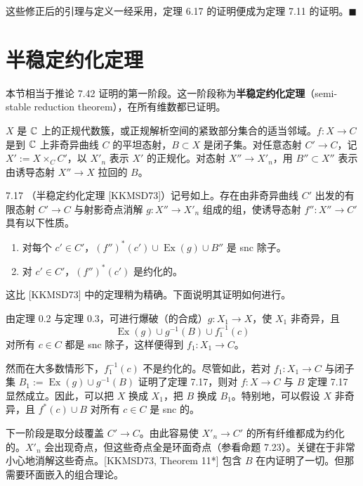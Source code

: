 这些修正后的引理与定义一经采用，定理 6.17 的证明便成为定理 7.11 的证明。\hfill$\blacksquare$

\section{半稳定约化定理}

本节相当于推论 7.42 证明的第一阶段。这一阶段称为\textbf{半稳定约化定理}（semi-stable reduction theorem），在所有维数都已证明。

$X$ 是 $\mathbb{C}$ 上的正规代数簇，或正规解析空间的紧致部分集合的适当邻域。$f\colon X\to C$ 是到 $\mathbb{C}$ 上非奇异曲线 $C$ 的平坦态射，$B\subset X$ 是闭子集。对任意态射 $C'\to C$，记 $X':=X\times_CC'$，以 $X'_n$ 表示 $X'$ 的正规化。对态射 $X''\to X'_n$，用 $B''\subset X''$ 表示由诱导态射 $X''\to X$ 拉回的 $B$。

\begin{theorem*}{7.17}
（半稳定约化定理 [KKMSD73]）记号如上。存在由非奇异曲线 $C'$ 出发的有限态射 $C'\to C$ 与射影奇点消解 $g\colon X''\to X'_n$ 组成的组，使诱导态射 $f''\colon X''\to C'$ 具有以下性质。
\begin{enumerate}[label=(\arabic*),leftmargin=2.4em,itemsep=1pt,topsep=2pt,parsep=0pt]
\item 对每个 $c'\in C'$，$(f'')^*(c')\cup\operatorname{Ex}(g)\cup B''$ 是 snc 除子。
\item 对 $c'\in C'$，$(f'')^*(c')$ 是约化的。
\end{enumerate}
\end{theorem*}

这比 [KKMSD73] 中的定理稍为精确。下面说明其证明如何进行。

由定理 0.2 与定理 0.3，可进行爆破（的合成）$g\colon X_1\to X$，使 $X_1$ 非奇异，且
\[
\operatorname{Ex}(g)\cup g^{-1}(B)\cup f_1^{-1}(c)
\]
对所有 $c\in C$ 都是 snc 除子，这样便得到 $f_1\colon X_1\to C$。

然而在大多数情形下，$f_1^{-1}(c)$ 不是约化的。尽管如此，若对 $f_1\colon X_1\to C$ 与闭子集 $B_1:=\operatorname{Ex}(g)\cup g^{-1}(B)$ 证明了定理 7.17，则对 $f\colon X\to C$ 与 $B$ 定理 7.17 显然成立。因此，可以把 $X$ 换成 $X_1$，把 $B$ 换成 $B_1$。特别地，可以假设 $X$ 非奇异，且 $f^*(c)\cup B$ 对所有 $c\in C$ 是 snc 的。

下一阶段是取分歧覆盖 $C'\to C$。由此容易使 $X'_n\to C'$ 的所有纤维都成为约化的。$X'_n$ 会出现奇点，但这些奇点全是环面奇点（参看命题 7.23）。关键在于非常小心地消解这些奇点。[KKMSD73, Theorem 11*] 包含 $B$ 在内证明了一切。但那需要环面嵌入的组合理论。

